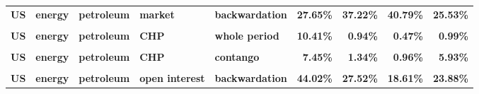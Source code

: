 \documentclass[
  authoryear,
  preprint,
  3p]{elsarticle}
\begin{document}
\begin{landscape}
\begin{longtable}[t]{>{}l>{}l>{}l>{}l>{}l>{}r>{}r>{}r>{}r}
\textbf{US} & \textbf{energy} & \textbf{petroleum} & \textbf{market} & \textbf{backwardation} & \textcolor[HTML]{4285f4}{\textbf{27.65\%}} & \textcolor[HTML]{4285f4}{\textbf{37.22\%}} & \textcolor[HTML]{4285f4}{\textbf{40.79\%}} & \textcolor[HTML]{4285f4}{\textbf{25.53\%}}\\
\textbf{\cellcolor{gray!10}{US}} & \textbf{\cellcolor{gray!10}{energy}} & \textbf{\cellcolor{gray!10}{petroleum}} & \textbf{\cellcolor{gray!10}{market}} & \textbf{\cellcolor{gray!10}{contango}} & \textcolor[HTML]{4285f4}{\textbf{\cellcolor{gray!10}{30.08\%}}} & \textcolor[HTML]{4285f4}{\textbf{\cellcolor{gray!10}{35.26\%}}} & \textcolor[HTML]{4285f4}{\textbf{\cellcolor{gray!10}{52.9\%}}} & \textcolor[HTML]{4285f4}{\textbf{\cellcolor{gray!10}{35.71\%}}}\\
\textbf{US} & \textbf{energy} & \textbf{petroleum} & \textbf{CHP} & \textbf{whole period} & \textcolor[HTML]{4285f4}{\textbf{10.41\%}} & \textcolor[HTML]{4285f4}{\textbf{0.94\%}} & \textcolor[HTML]{4285f4}{\textbf{0.47\%}} & \textcolor[HTML]{4285f4}{\textbf{0.99\%}}\\
\addlinespace
\textbf{\cellcolor{gray!10}{US}} & \textbf{\cellcolor{gray!10}{energy}} & \textbf{\cellcolor{gray!10}{petroleum}} & \textbf{\cellcolor{gray!10}{CHP}} & \textbf{\cellcolor{gray!10}{backwardation}} & \textcolor[HTML]{4285f4}{\textbf{\cellcolor{gray!10}{13.69\%}}} & \textcolor[HTML]{4285f4}{\textbf{\cellcolor{gray!10}{0.63\%}}} & \textcolor[HTML]{4285f4}{\textbf{\cellcolor{gray!10}{0.15\%}}} & \textcolor[HTML]{4285f4}{\textbf{\cellcolor{gray!10}{1.14\%}}}\\
\textbf{US} & \textbf{energy} & \textbf{petroleum} & \textbf{CHP} & \textbf{contango} & \textcolor[HTML]{4285f4}{\textbf{7.45\%}} & \textcolor[HTML]{4285f4}{\textbf{1.34\%}} & \textcolor[HTML]{4285f4}{\textbf{0.96\%}} & \textcolor[HTML]{4285f4}{\textbf{5.93\%}}\\
\textbf{\cellcolor{gray!10}{US}} & \textbf{\cellcolor{gray!10}{energy}} & \textbf{\cellcolor{gray!10}{petroleum}} & \textbf{\cellcolor{gray!10}{open interest}} & \textbf{\cellcolor{gray!10}{whole period}} & \textcolor[HTML]{4285f4}{\textbf{\cellcolor{gray!10}{45.97\%}}} & \textcolor[HTML]{4285f4}{\textbf{\cellcolor{gray!10}{35.46\%}}} & \textcolor[HTML]{4285f4}{\textbf{\cellcolor{gray!10}{23.06\%}}} & \textcolor[HTML]{4285f4}{\textbf{\cellcolor{gray!10}{31.56\%}}}\\
\textbf{US} & \textbf{energy} & \textbf{petroleum} & \textbf{open interest} & \textbf{backwardation} & \textcolor[HTML]{4285f4}{\textbf{44.02\%}} & \textcolor[HTML]{4285f4}{\textbf{27.52\%}} & \textcolor[HTML]{4285f4}{\textbf{18.61\%}} & \textcolor[HTML]{4285f4}{\textbf{23.88\%}}\\

\end{longtable}
\end{landscape}
\end{document}
